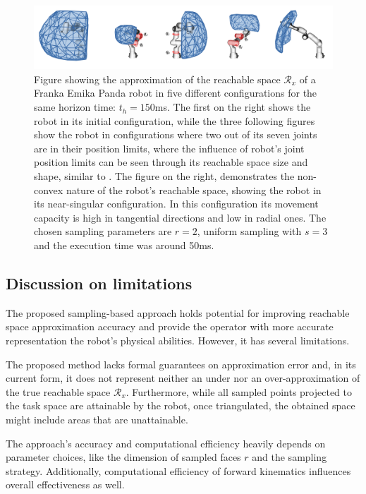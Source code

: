 \begin{figure}[!h]
    \centering
    \includegraphics[width=\textwidth]{Papers/images/some_poses_robot_curved.png}
    \caption{Figure showing the approximation of the reachable space $\mathcal{R}_x$ of a Franka Emika Panda robot in five different configurations for the same horizon time: $t_h=150$ms. The first on the right shows the robot in its initial configuration, while the three following figures show the robot in configurations where two out of its seven joints are in their position limits, where the influence of robot's joint position limits can be seen through its reachable space size and shape, similar to . The figure on the right, demonstrates the non-convex nature of the robot's reachable space, showing the robot in its near-singular configuration. In this configuration its movement capacity is high in tangential directions and low in radial ones. The chosen sampling parameters are $r=2$, uniform sampling with $s=3$ and the execution time was around 50ms.}
    \label{fig:curved_space_algo_new_real_panda_curved}
\end{figure}

\subsection{Discussion on limitations}

The proposed sampling-based approach holds potential for improving reachable space approximation accuracy and provide the operator with more accurate representation the robot's physical abilities. However, it has several limitations. 

The proposed method lacks formal guarantees on approximation error and, in its current form, it does not represent neither an under nor an over-approximation of the true reachable space $\mathcal{R}_x$. Furthermore, while all sampled points projected to the task space are attainable by the robot, once triangulated, the obtained space might include areas that are unattainable.

The approach's accuracy and computational efficiency heavily depends on parameter choices, like the dimension of sampled faces $r$ and the sampling strategy. Additionally, computational efficiency of forward kinematics influences overall effectiveness as well. 

